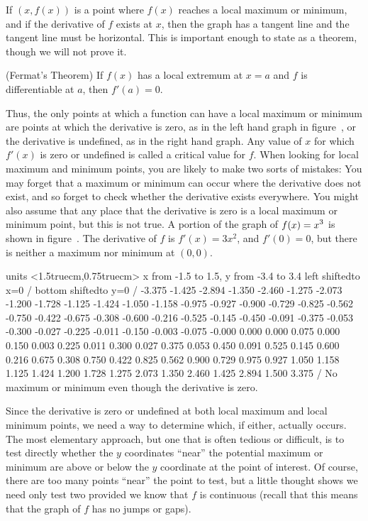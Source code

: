 If $(x,f(x))$ is a point where $f(x)$ reaches a local maximum or minimum,
and if the derivative of $f$ exists at $x$, then the graph has a
tangent line and the tangent line must be horizontal. This is
important enough to state as a theorem, though we will not prove it.

\thm (Fermat's Theorem) If $f(x)$ has a local extremum at $x=a$ and
$f$ is differentiable at $a$, then $f'(a)=0$.
\endthmnoproof
{}

Thus, the only
points at which a function can have a local maximum or minimum are
points at which the derivative is zero, as in the left hand graph in
figure~,
or the derivative is undefined, as in the right hand graph. Any value
of $x$ for which $f'(x)$ is zero or undefined is called a
{\dfont critical
value\/} for $f$.
When looking for local maximum and minimum points, you are likely to
make two sorts of mistakes: You may forget that a maximum or minimum
can occur where the derivative does not exist, and so forget to check
whether the derivative exists everywhere. You might also assume that
any place that the derivative is zero is a local maximum or minimum
point, but this is not true. A portion of the graph of $\displaystyle f(x)=x^3$ is
shown in figure~. The derivative of $f$ is
$f'(x)=3x^2$, and $f'(0)=0$, but there is neither a maximum nor
minimum at $(0,0)$.

\figure
\texonly
\vbox{\beginpicture
\normalgraphs
\ninepoint
\setcoordinatesystem units <1.5truecm,0.75truecm>
\setplotarea x from -1.5 to 1.5, y from -3.4 to 3.4
\axis left shiftedto x=0 /
\axis bottom shiftedto y=0 /
\setquadratic
{} -3.375 -1.425 -2.894 -1.350 -2.460 -1.275 -2.073 -1.200 -1.728 
-1.125 -1.424 -1.050 -1.158 -0.975 -0.927 -0.900 -0.729 -0.825 -0.562 
-0.750 -0.422 -0.675 -0.308 -0.600 -0.216 -0.525 -0.145 -0.450 -0.091 
-0.375 -0.053 -0.300 -0.027 -0.225 -0.011 -0.150 -0.003 -0.075 -0.000 
0.000 0.000 0.075 0.000 0.150 0.003 0.225 0.011 0.300 0.027 
0.375 0.053 0.450 0.091 0.525 0.145 0.600 0.216 0.675 0.308 
0.750 0.422 0.825 0.562 0.900 0.729 0.975 0.927 1.050 1.158 
1.125 1.424 1.200 1.728 1.275 2.073 1.350 2.460 1.425 2.894 
1.500 3.375 /
\endpicture}
\endtexonly
{}
\begincaption
No maximum or minimum even though the derivative is zero.
\endcaption
\endfigure

Since the derivative is zero or undefined at both local maximum and
local minimum points, we need a way to determine which, if either,
actually occurs. The most
elementary approach, but one that is often tedious or difficult, is to
test directly whether the $y$ coordinates ``near'' the potential
maximum or minimum are above or below the $y$ coordinate at the point
of interest. Of course, there are too many points ``near'' the point
to test, but a little thought shows we need only test two provided we
know that $f$ is continuous (recall that this means that the graph of
$f$ has no jumps or gaps).

